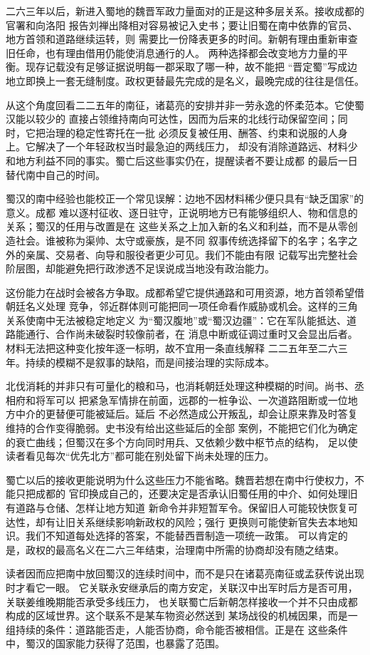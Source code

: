 二六三年以后，新进入蜀地的魏晋军政力量面对的正是这种多层关系。接收成都的官署和向洛阳
报告刘禅出降相对容易被记入史书；要让旧蜀在南中依靠的官员、地方首领和道路继续运转，则
需要比一份降表更多的时间。新朝有理由重新审查旧任命，也有理由借用仍能使消息通行的人。
两种选择都会改变地方力量的平衡。现存记载没有足够证据说明每一郡采取了哪一种，故不能把
“晋定蜀”写成边地立即换上一套无缝制度。政权更替最先完成的是名义，最晚完成的往往是信任。

从这个角度回看二二五年的南征，诸葛亮的安排并非一劳永逸的怀柔范本。它使蜀汉能以较少的
直接占领维持南向可达性，因而为后来的北线行动保留空间；同时，它把治理的稳定性寄托在一批
必须反复被任用、酬答、约束和说服的人身上。它解决了一个年轻政权当时最急迫的两线压力，
却没有消除道路远、材料少和地方利益不同的事实。蜀亡后这些事实仍在，提醒读者不要让成都
的最后一日替代南中自己的时间。

蜀汉的南中经验也能校正一个常见误解：边地不因材料稀少便只具有“缺乏国家”的意义。成都
难以逐村征收、逐日驻守，正说明地方已有能够组织人、物和信息的关系；蜀汉的任用与改置是在
这些关系之上加入新的名义和利益，而不是从零创造社会。谁被称为渠帅、太守或豪族，是不同
叙事传统选择留下的名字；名字之外的亲属、交易者、向导和服役者更少可见。我们不能由有限
记载写出完整社会阶层图，却能避免把行政渗透不足误说成当地没有政治能力。

这份能力在战时会被各方争取。成都希望它提供通路和可用资源，地方首领希望借朝廷名义处理
竞争，邻近群体则可能把同一项任命看作威胁或机会。这样的三角关系使南中无法被稳定地定义
为“蜀汉腹地”或“蜀汉边疆”：它在军队能抵达、道路能通行、合作尚未破裂时较像前者，在
消息中断或征调过重时又会显出后者。材料无法把这种变化按年逐一标明，故不宜用一条直线解释
二二五年至二六三年。持续的模糊不是叙事的缺陷，而是间接治理的实际成本。

北伐消耗的并非只有可量化的粮和马，也消耗朝廷处理这种模糊的时间。尚书、丞相府和将军可以
把紧急军情排在前面，远郡的一桩争讼、一次道路阻断或一位地方中介的更替便可能被延后。延后
不必然造成公开叛乱，却会让原来靠及时答复维持的合作变得脆弱。史书没有给出这些延后的全部
案例，不能把它们化为确定的衰亡曲线；但蜀汉在多个方向同时用兵、又依赖少数中枢节点的结构，
足以使读者看见每次“优先北方”都可能在别处留下尚未处理的压力。

蜀亡以后的接收更能说明为什么这些压力不能省略。魏晋若想在南中行使权力，不能只把成都的
官印换成自己的，还要决定是否承认旧蜀任用的中介、如何处理旧有道路与仓储、怎样让地方知道
新命令并非短暂军令。保留旧人可能较快恢复可达性，却有让旧关系继续影响新政权的风险；强行
更换则可能使新官失去本地知识。我们不知道每处选择的答案，不能替西晋制造一项统一政策。
可以肯定的是，政权的最高名义在二六三年结束，治理南中所需的协商却没有随之结束。

读者因而应把南中放回蜀汉的连续时间中，而不是只在诸葛亮南征或孟获传说出现时才看它一眼。
它关联永安继承后的南方安定，关联汉中出军时后方是否可用，关联姜维晚期能否承受多线压力，
也关联蜀亡后新朝怎样接收一个并不只由成都构成的区域世界。这个联系不是某车物资必然送到
某场战役的机械因果，而是一组持续的条件：道路能否走，人能否协商，命令能否被相信。正是在
这些条件中，蜀汉的国家能力获得了范围，也暴露了范围。

